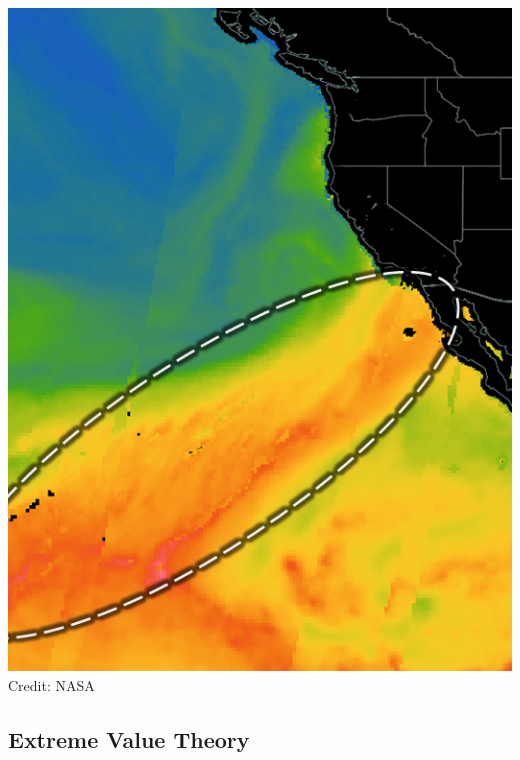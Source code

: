 \documentclass[aspectratio=169]{beamer}
\begin{document}
\begin{frame}
\begin{minipage}{.25\textwidth}
    \includegraphics[width=\textwidth]{./images/ar}\\
    {\scriptsize Credit: NASA}
   \end{minipage}
\end{frame}

\subsection{Extreme Value Theory}
\end{document}
